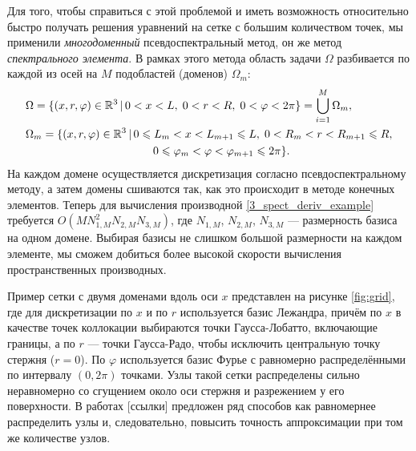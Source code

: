 \documentclass[12pt, a4paper]{report}
\begin{document}
Для того, чтобы справиться с этой проблемой и иметь возможность относительно быстро получать решения уравнений на сетке с большим количеством точек, мы применили \emph{многодоменный} псевдоспектральный метод, он же метод \emph{спектрального элемента}.
В рамках этого метода область задачи $\Omega$ разбивается по каждой из осей на $M$ подобластей (доменов) $\Omega_m$:
\begin{align*}
&\Omega = \{(x,r,\varphi)\in\mathbb{R}^3 \, | \, 0<x<L, \; 0<r<R, \; 0<\varphi<2\pi\} = \bigcup\limits_{i=1}^{M} \Omega_m,\\
&\Omega_m = \{(x,r,\varphi)\in\mathbb{R}^3 \, | \, 0\leqslant L_{m}<x<L_{m+1}\leqslant L, \; 0<R_m<r<R_{m+1}\leqslant R, \\
&\hspace{40mm} 0\leqslant \varphi_m<\varphi<\varphi_{m+1}\leqslant 2\pi\}.
\end{align*}
На каждом домене осуществляется дискретизация согласно псевдоспектральному методу, а затем домены сшиваются так, как это происходит в методе конечных элементов. Теперь для вычисления производной \eqref{3_spect_deriv_example} требуется $O(M N_{1,M}^2 N_{2,M} N_{3,M})$, где $N_{1,M}$, $N_{2,M}$, $N_{3,M}$ --- размерность базиса на одном домене. Выбирая базисы не слишком большой размерности на каждом элементе, мы сможем добиться более высокой скорости вычисления пространственных производных.

Пример сетки с двумя доменами вдоль оси $x$ представлен на рисунке \ref{fig:grid}, где для дискретизации по $x$ и по $r$ используется базис Лежандра, причём по $x$ в качестве точек коллокации выбираются точки Гаусса-Лобатто, включающие границы, а по $r$ --- точки Гаусса-Радо, чтобы исключить центральную точку стержня ($r=0$). По $\varphi$ используется базис Фурье с равномерно распределёнными по интервалу $(0, 2\pi)$ точками.
Узлы такой сетки распределены сильно неравномерно со сгущением около оси стержня и разрежением у его поверхности. В работах [ссылки] предложен ряд способов как равномернее распределить узлы и, следовательно, повысить точность аппроксимации при том же количестве узлов.

\end{document}
